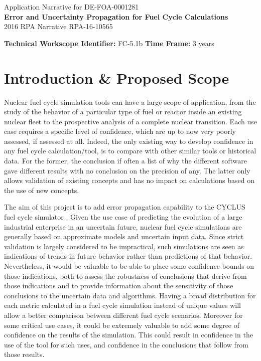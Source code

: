 \documentclass[dvips,12pt]{article}
\begin{document}
\begin{centering}
  Application Narrative for DE-FOA-0001281\\
  \textbf{\large Error and Uncertainty Propagation for Fuel Cycle Calculations}\\
  2016 RPA Narrative RPA-16-10565\\
\end{centering}
\vspace{1em}

\noindent\textbf{Technical Workscope Identifier:} FC-5.1b \hspace{1.5in} \textbf{Time Frame:} 3 years

\section{Introduction \& Proposed Scope}
Nuclear fuel cycle simulation tools can have a large
scope of application, from the study of the
behavior of a particular type of fuel or reactor inside an
existing nuclear fleet to the prospective analysis
of a complete nuclear transition. 
Each use case
requires a specific level
of confidence, which are up to now very
poorly assessed, if assessed at all.
Indeed, the only existing way to develop confidence in
any fuel cycle calculation/tool, is to compare
with other similar tools or historical
data.  For the former, the conclusion if often 
a list of why the different software gave
different results with no conclusion on the
precision of any.  The latter only allows
validation of existing concepts and has no impact
on calculations based on the use of new
concepts.

The aim of this project is to add error
propagation capability to the CYCLUS fuel cycle
simulator \cite{CYCLUS}. Given the use case of predicting the
evolution of a large industrial enterprise in an
uncertain future, nuclear fuel cycle simulations
are generally based on approximate models and
uncertain input data.  Since strict validation is largely
considered to be impractical, such simulations are
seen as indications of trends in future behavior rather than
predictions of that behavior. Nevertheless, it
would be valuable to be able to place some
confidence bounds on those indications, both to
assess the robustness of conclusions that derive
from those indications and to provide information
about the sensitivity of those conclusions to the
uncertain data and algorithms.  Having a broad
distribution for each metric calculated in a fuel
cycle simulation instead of unique values will
allow a better comparison between different fuel
cycle scenarios.  Moreover for some critical
use cases, it could be extremely valuable to add
some degree of confidence on the results of the simulation.
This could result in confidence in the use of the tool for
such uses, and confidence in the conclusions that follow
from those results.
\end{document}
